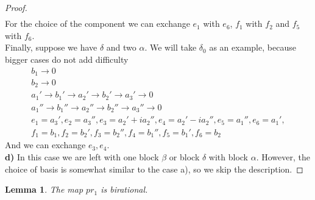 \documentclass[12pt]{amsart}
\newtheorem{lem}[thm]{Lemma}
\theoremstyle{definition}
\theoremstyle{remark}
\numberwithin{equation}{subsection}
\begin{document}
\begin{proof}
\begin{equation}
\begin{gathered}
\end{gathered}
\end{equation}
For the choice of the component we can exchange $e_{1}$ with $e_{6}$, $f_{1}$ with $f_{2}$ and $f_{5}$ with $f_{6}$.\\
Finally, suppose we have $\delta$ and two $\alpha$. We will take $\delta_0$ as an example, because bigger cases do not add difficulty
\begin{equation}
\begin{gathered}
     b_1 \rightarrow  0\\
     b_2 \rightarrow  0\\
    a_1' \rightarrow b_1' \rightarrow a_2' \rightarrow b_2' \rightarrow a_3' \rightarrow 0\\
    a_1'' \rightarrow b_1'' \rightarrow a_2'' \rightarrow b_2'' \rightarrow a_3'' \rightarrow 0\\
    e_{1}=a_3',e_{2}=a_3'', e_{3}=a_2'+ia_2'', e_{4}=a_2'-ia_2'',e_{5}=a_1'',e_{6}=a_1',\\ f_{1}=b_1, f_{2}=b_2', f_{3}=b_2'', f_{4}=b_1'',f_{5}=b_1',f_{6}=b_2 
\end{gathered}
\end{equation}
And we can exchange $e_{3},e_{4}$.\\
\textbf{d)} In this case we are left with one block $\beta$ or block $\delta$ with block $\alpha$. However, the choice of basis is somewhat similar to the case a), so we skip the description.
\end{proof}

\begin{lem}
  \label{lem5}
  The map $pr_1$ is birational.
\end{lem}
\end{document}
